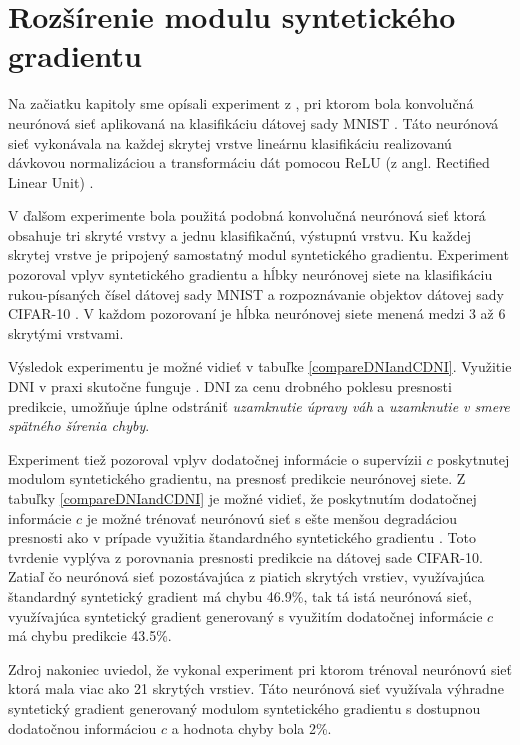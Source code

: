 \section{Rozšírenie modulu syntetického gradientu}
\label{experiment_SG2}

Na začiatku kapitoly sme opísali experiment z \cite{Jaderberg2016}, pri ktorom bola konvolučná neurónová sieť aplikovaná na klasifikáciu dátovej sady MNIST \cite{yann1998mnist}. Táto neurónová sieť vykonávala na každej skrytej vrstve lineárnu klasifikáciu realizovanú dávkovou normalizáciou \cite{Ioffe2015} a transformáciu dát pomocou ReLU (z angl. Rectified Linear Unit) \cite{Xu2015}. 

V ďalšom experimente \cite{Jaderberg2016} bola použitá podobná konvolučná neurónová sieť ktorá obsahuje tri skryté vrstvy a jednu klasifikačnú, výstupnú vrstvu. Ku každej skrytej vrstve je pripojený samostatný modul syntetického gradientu. Experiment pozoroval vplyv syntetického gradientu a hĺbky neurónovej siete na klasifikáciu rukou-písaných čísel dátovej sady MNIST a rozpoznávanie objektov dátovej sady CIFAR-10 \cite{Krizhevsky09learningmultiple}. V každom pozorovaní je hĺbka neurónovej siete menená medzi 3 až 6 skrytými vrstvami. 

Výsledok experimentu je možné vidieť v tabuľke \ref{compareDNIandCDNI}. Využitie DNI v praxi skutočne funguje \cite{Jaderberg2016}. DNI za cenu drobného poklesu presnosti predikcie, umožňuje úplne odstrániť \textit{uzamknutie úpravy váh} a \textit{uzamknutie v smere spätného šírenia chyby}. 

Experiment tiež pozoroval vplyv dodatočnej informácie o supervízii $c$ poskytnutej modulom syntetického gradientu, na presnosť predikcie neurónovej siete. Z tabuľky \ref{compareDNIandCDNI} je možné vidieť, že poskytnutím dodatočnej informácie $c$ je možné trénovať neurónovú sieť s ešte menšou degradáciou presnosti ako v prípade využitia štandardného syntetického gradientu \cite{Jaderberg2016}. Toto tvrdenie vyplýva z porovnania presnosti predikcie na dátovej sade CIFAR-10. Zatiaľ čo neurónová sieť pozostávajúca z piatich skrytých vrstiev, využívajúca štandardný syntetický gradient má chybu 46.9\%, tak tá istá neurónová sieť, využívajúca syntetický gradient generovaný s využitím dodatočnej informácie $c$ má chybu predikcie 43.5\%. 

Zdroj \cite{Jaderberg2016} nakoniec uviedol, že vykonal experiment pri ktorom trénoval neurónovú sieť ktorá mala viac ako 21 skrytých vrstiev. Táto neurónová sieť využívala výhradne syntetický gradient generovaný modulom syntetického gradientu s dostupnou dodatočnou informáciou $c$ a hodnota chyby bola 2\%.

